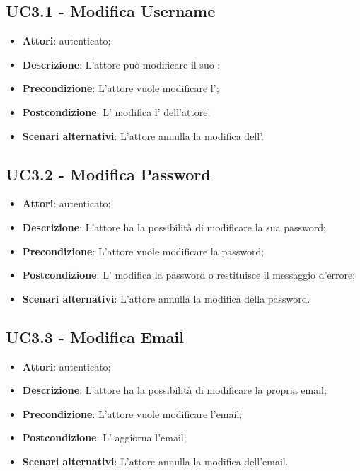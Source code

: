 \subsection{UC3.1 - Modifica Username}
\label{ssec:UC3.1}
\begin{itemize}
\item \textbf{Attori}:  autenticato;
\item \textbf{Descrizione}: L'attore può modificare il suo ;
\item \textbf{Precondizione}: L'attore vuole modificare l';
\item \textbf{Postcondizione}: L' modifica l'  dell'attore;
\item \textbf{Scenari alternativi}: L'attore annulla la modifica dell'.
\end{itemize}
\subsection{UC3.2 - Modifica Password}
\label{ssec:UC3.2}
\begin{itemize}
\item \textbf{Attori}:  autenticato;
\item \textbf{Descrizione}: L'attore ha la possibilità di modificare la sua password;
\item \textbf{Precondizione}: L'attore vuole modificare la password;
\item \textbf{Postcondizione}: L' modifica la password o restituisce il messaggio d'errore;
\item \textbf{Scenari alternativi}: L'attore annulla la modifica della password.
\end{itemize}
\subsection{UC3.3 - Modifica Email}
\label{ssec:UC3.3}
\begin{itemize}
\item \textbf{Attori}:  autenticato;
\item \textbf{Descrizione}: L'attore ha la possibilità di modificare la propria email;
\item \textbf{Precondizione}: L'attore vuole modificare l'email;
\item \textbf{Postcondizione}: L' aggiorna l'email;
\item \textbf{Scenari alternativi}: L'attore annulla la modifica dell'email.
\end{itemize}
